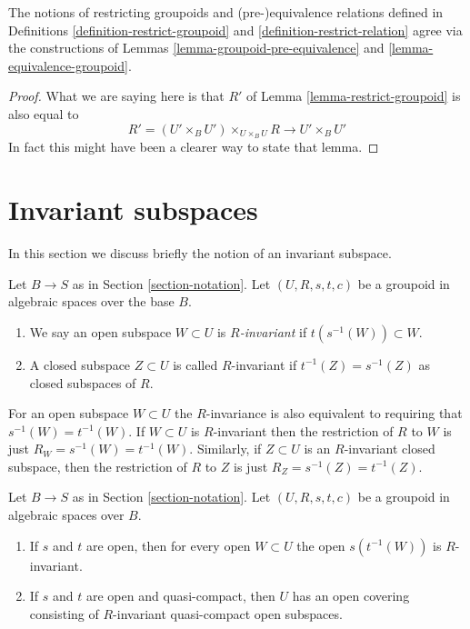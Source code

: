 \begin{lemma}
\label{lemma-restrict-groupoid-relation}
The notions of restricting groupoids and
(pre-)equivalence relations defined in Definitions
\ref{definition-restrict-groupoid} and \ref{definition-restrict-relation}
agree via the constructions of
Lemmas \ref{lemma-groupoid-pre-equivalence} and
\ref{lemma-equivalence-groupoid}.
\end{lemma}

\begin{proof}
What we are saying here is that $R'$ of
Lemma \ref{lemma-restrict-groupoid} is also
equal to
$$
R' = (U' \times_B U')\times_{U \times_B U} R
\longrightarrow
U' \times_B U'
$$
In fact this might have been a clearer way to state that lemma.
\end{proof}





\section{Invariant subspaces}
\label{section-invariant}

\noindent
In this section we discuss briefly the notion of an invariant subspace.

\begin{definition}
\label{definition-invariant-open}
Let $B \to S$ as in Section \ref{section-notation}.
Let $(U, R, s, t, c)$ be a groupoid in algebraic spaces over the base $B$.
\begin{enumerate}
\item We say an open subspace $W \subset U$ is {\it $R$-invariant} if
$t(s^{-1}(W)) \subset W$.
\item A closed subspace $Z \subset U$ is called $R$-invariant
if $t^{-1}(Z) = s^{-1}(Z)$ as closed subspaces of $R$.
\end{enumerate}
\end{definition}

\noindent
For an open subspace $W \subset U$ the $R$-invariance
is also equivalent to requiring that $s^{-1}(W) = t^{-1}(W)$.
If $W \subset U$ is $R$-invariant then the restriction of $R$ to
$W$ is just $R_W = s^{-1}(W) = t^{-1}(W)$. Similarly, if $Z \subset U$
is an $R$-invariant closed subspace, then the restriction of $R$
to $Z$ is just $R_Z = s^{-1}(Z) = t^{-1}(Z)$.

\begin{lemma}
\label{lemma-constructing-invariant-opens}
Let $B \to S$ as in Section \ref{section-notation}.
Let $(U, R, s, t, c)$ be a groupoid in algebraic spaces over $B$.
\begin{enumerate}
\item If $s$ and $t$ are open, then for every open $W \subset U$
the open $s(t^{-1}(W))$ is $R$-invariant.
\item If $s$ and $t$ are open and quasi-compact, then $U$ has an open
covering consisting of $R$-invariant quasi-compact open subspaces.
\end{enumerate}
\end{lemma}

